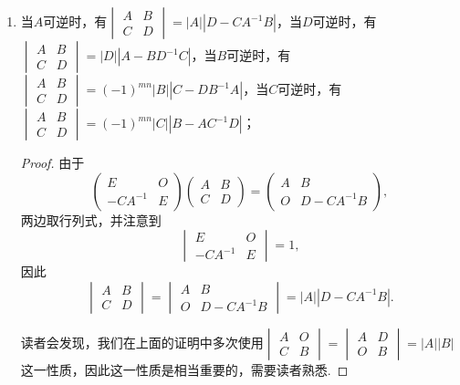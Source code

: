 \begin{enumerate}
    \item 当$A$可逆时，有$\begin{vmatrix}
                  A & B \\ C & D
              \end{vmatrix} = |A||D-CA^{-1}B|$，当$D$可逆时，有$\begin{vmatrix}
                  A & B \\ C & D
              \end{vmatrix} = |D||A-BD^{-1}C|$，当$B$可逆时，有$\begin{vmatrix}
                  A & B \\ C & D
              \end{vmatrix} = (-1)^{mn}|B||C-DB^{-1}A|$，当$C$可逆时，有$\begin{vmatrix}
                  A & B \\ C & D
              \end{vmatrix} = (-1)^{mn}|C||B-AC^{-1}D|$；
          \begin{proof}
              由于
              \[\begin{pmatrix}
                      E & O \\ -CA^{-1} & E
                  \end{pmatrix}\begin{pmatrix}
                      A & B \\ C & D
                  \end{pmatrix}= \begin{pmatrix}
                      A & B \\ O & D-CA^{-1}B
                  \end{pmatrix},\]
              两边取行列式，并注意到
              \[\begin{vmatrix}
                      E & O \\ -CA^{-1} & E
                  \end{vmatrix}=1,\]
              因此
              \[\begin{vmatrix}
                      A & B \\ C & D
                  \end{vmatrix}=\begin{vmatrix}
                      A & B \\ O & D-CA^{-1}B
                  \end{vmatrix}=|A||D-CA^{-1}B|.\]

              读者会发现，我们在上面的证明中多次使用$\begin{vmatrix}
                      A & O \\ C & B
                  \end{vmatrix} = \begin{vmatrix}
                      A & D \\ O & B
                  \end{vmatrix} = |A||B|$这一性质，因此这一性质是相当重要的，需要读者熟悉.


\end{proof}
\end{enumerate}
